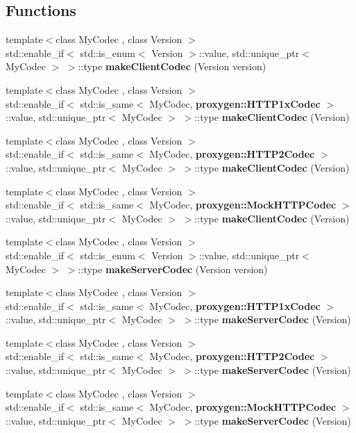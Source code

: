 \subsection*{Functions}
\begin{DoxyCompactItemize}
\item 
{\footnotesize template$<$class My\+Codec , class Version $>$ }\\std\+::enable\+\_\+if$<$ std\+::is\+\_\+enum$<$ Version $>$\+::value, std\+::unique\+\_\+ptr$<$ My\+Codec $>$ $>$\+::type {\bf make\+Client\+Codec} (Version version)
\item 
{\footnotesize template$<$class My\+Codec , class Version $>$ }\\std\+::enable\+\_\+if$<$ std\+::is\+\_\+same$<$ My\+Codec, {\bf proxygen\+::\+H\+T\+T\+P1x\+Codec} $>$\+::value, std\+::unique\+\_\+ptr$<$ My\+Codec $>$ $>$\+::type {\bf make\+Client\+Codec} (Version)
\item 
{\footnotesize template$<$class My\+Codec , class Version $>$ }\\std\+::enable\+\_\+if$<$ std\+::is\+\_\+same$<$ My\+Codec, {\bf proxygen\+::\+H\+T\+T\+P2\+Codec} $>$\+::value, std\+::unique\+\_\+ptr$<$ My\+Codec $>$ $>$\+::type {\bf make\+Client\+Codec} (Version)
\item 
{\footnotesize template$<$class My\+Codec , class Version $>$ }\\std\+::enable\+\_\+if$<$ std\+::is\+\_\+same$<$ My\+Codec, {\bf proxygen\+::\+Mock\+H\+T\+T\+P\+Codec} $>$\+::value, std\+::unique\+\_\+ptr$<$ My\+Codec $>$ $>$\+::type {\bf make\+Client\+Codec} (Version)
\item 
{\footnotesize template$<$class My\+Codec , class Version $>$ }\\std\+::enable\+\_\+if$<$ std\+::is\+\_\+enum$<$ Version $>$\+::value, std\+::unique\+\_\+ptr$<$ My\+Codec $>$ $>$\+::type {\bf make\+Server\+Codec} (Version version)
\item 
{\footnotesize template$<$class My\+Codec , class Version $>$ }\\std\+::enable\+\_\+if$<$ std\+::is\+\_\+same$<$ My\+Codec, {\bf proxygen\+::\+H\+T\+T\+P1x\+Codec} $>$\+::value, std\+::unique\+\_\+ptr$<$ My\+Codec $>$ $>$\+::type {\bf make\+Server\+Codec} (Version)
\item 
{\footnotesize template$<$class My\+Codec , class Version $>$ }\\std\+::enable\+\_\+if$<$ std\+::is\+\_\+same$<$ My\+Codec, {\bf proxygen\+::\+H\+T\+T\+P2\+Codec} $>$\+::value, std\+::unique\+\_\+ptr$<$ My\+Codec $>$ $>$\+::type {\bf make\+Server\+Codec} (Version)
\item 
{\footnotesize template$<$class My\+Codec , class Version $>$ }\\std\+::enable\+\_\+if$<$ std\+::is\+\_\+same$<$ My\+Codec, {\bf proxygen\+::\+Mock\+H\+T\+T\+P\+Codec} $>$\+::value, std\+::unique\+\_\+ptr$<$ My\+Codec $>$ $>$\+::type {\bf make\+Server\+Codec} (Version)
\end{DoxyCompactItemize}


